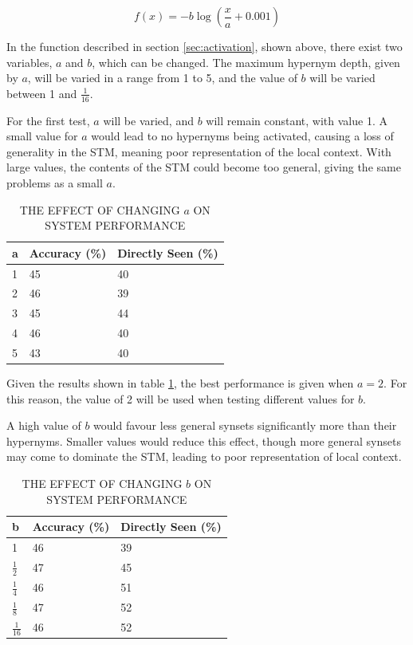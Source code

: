 \documentclass[]{article}
\begin{document}
\[f(x) = -b\log(\frac{x}{a}+0.001)\]

In the function described in section \ref{sec:activation}, shown above, there exist two variables, $a$ and $b$, which can be changed. The maximum hypernym depth, given by $a$, will be varied in a range from 1 to 5, and the value of $b$ will be varied between 1 and $\frac{1}{16}$.

For the first test, $a$ will be varied, and $b$ will remain constant, with value 1. A small value for $a$ would lead to no hypernyms being activated, causing a loss of generality in the STM, meaning poor representation of the local context. With large values, the contents of the STM could become too general, giving the same problems as a small $a$.

\begin{table}
\begin{center}
\begin{tabular}{|p{2em}|p{7em}|p{7em}|}
	\hline
	a & Accuracy (\%) & Directly Seen (\%) \\
	\hline
	1 & 45 & 40\\
	\hline
	2 & 46 & 39\\
	\hline
	3 & 45 & 44\\
	\hline
	4 & 46 & 40\\
	\hline
	5 & 43 & 40\\
	\hline
\end{tabular}
\end{center}
\caption{THE EFFECT OF CHANGING $a$ ON SYSTEM PERFORMANCE}
\label{table:aActivation}
\end{table}

Given the results shown in table \ref{table:aActivation}, the best performance is given when $a = 2$. For this reason, the value of 2 will be used when testing different values for $b$.

A high value of $b$ would favour less general synsets significantly more than their hypernyms. Smaller values would reduce this effect, though more general synsets may come to dominate the STM, leading to poor representation of local context.

\begin{table}
\begin{center}
\begin{tabular}{|p{2em}|p{7em}|p{7em}|}
	\hline
	b & Accuracy (\%) & Directly Seen (\%) \\
	\hline
	1 & 46 & 39\\
	\hline
	$\frac{1}{2}$ & 47 & 45\\
	\hline
	$\frac{1}{4}$ & 46 & 51\\
	\hline
	$\frac{1}{8}$ & 47 & 52\\
	\hline
	$\frac{1}{16}$ & 46 & 52\\
	\hline
\end{tabular}
\end{center}
\caption{THE EFFECT OF CHANGING $b$ ON SYSTEM PERFORMANCE}
\label{table:bActivation}
\end{table}
\end{document}
